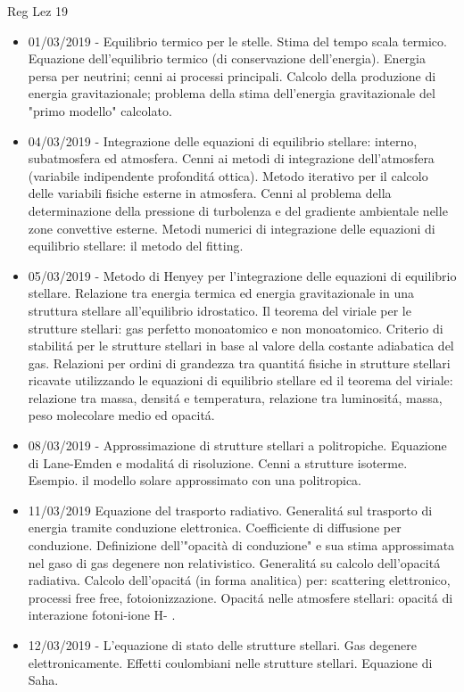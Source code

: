\begin{frame}[allowframebreaks]{Reg Lez 19}
\begin{itemize}
\item 01/03/2019 - Equilibrio termico per le stelle. Stima del tempo scala termico. Equazione dell'equilibrio termico (di conservazione dell'energia). Energia persa per neutrini; cenni ai processi principali. Calcolo della produzione di energia gravitazionale; problema della stima dell'energia gravitazionale del "primo modello" calcolato. 
\item 04/03/2019 - Integrazione delle equazioni di equilibrio stellare: interno, subatmosfera ed atmosfera. Cenni ai metodi di integrazione dell'atmosfera (variabile indipendente profondit\'a ottica). Metodo iterativo per il calcolo delle variabili fisiche esterne in atmosfera. Cenni al problema della determinazione della pressione di turbolenza e del gradiente ambientale nelle zone convettive esterne. Metodi numerici di integrazione delle equazioni di equilibrio stellare: il metodo del fitting. 
\item 05/03/2019 - Metodo di Henyey per l'integrazione delle equazioni di equilibrio stellare. Relazione tra energia termica ed energia gravitazionale in una struttura stellare all'equilibrio idrostatico. Il teorema del viriale per le strutture stellari: gas perfetto monoatomico e non monoatomico. Criterio di stabilit\'a per le strutture stellari in base al valore della costante adiabatica del gas. Relazioni per ordini di grandezza tra quantit\'a fisiche in strutture stellari ricavate utilizzando le equazioni di equilibrio stellare ed il teorema del viriale: relazione tra massa, densit\'a e temperatura, relazione tra luminosit\'a, massa, peso molecolare medio ed opacit\'a. 
\item 08/03/2019 - Approssimazione di strutture stellari a politropiche. Equazione di Lane-Emden e modalit\'a di risoluzione. Cenni a strutture isoterme. Esempio. il modello solare approssimato con una politropica. 
\item 11/03/2019 Equazione del trasporto radiativo. Generalit\'a sul trasporto di energia tramite conduzione elettronica. Coefficiente di diffusione per conduzione. Definizione dell'"opacità di conduzione" e sua stima approssimata nel gaso di gas degenere non relativistico. Generalit\'a su calcolo dell'opacit\'a radiativa. Calcolo dell'opacit\'a (in forma analitica) per: scattering elettronico, processi free free, fotoionizzazione. Opacit\'a nelle atmosfere stellari: opacit\'a di interazione fotoni-ione H- . 
\item 12/03/2019 - L'equazione di stato delle strutture stellari. Gas degenere elettronicamente. Effetti coulombiani nelle strutture stellari. Equazione di Saha.

\end{itemize}
\end{frame}
